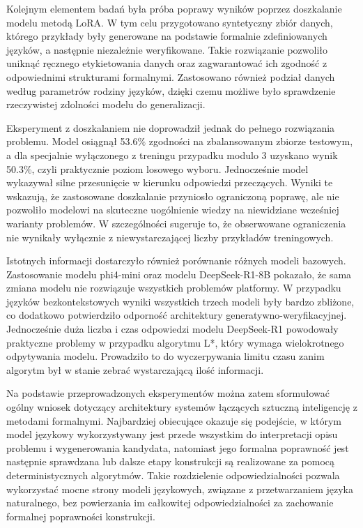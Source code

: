 \documentclass[12pt]{article}
\begin{document}
Kolejnym elementem badań była próba poprawy wyników poprzez doszkalanie modelu metodą LoRA. W tym celu przygotowano syntetyczny zbiór danych, którego przykłady były generowane na podstawie formalnie zdefiniowanych języków, a następnie niezależnie weryfikowane. Takie rozwiązanie pozwoliło uniknąć ręcznego etykietowania danych oraz zagwarantować ich zgodność z odpowiednimi strukturami formalnymi. Zastosowano również podział danych według parametrów rodziny języków, dzięki czemu możliwe było sprawdzenie rzeczywistej zdolności modelu do generalizacji.

Eksperyment z doszkalaniem nie doprowadził jednak do pełnego rozwiązania problemu. Model osiągnął 53.6\(\%\) zgodności na zbalansowanym zbiorze testowym, a dla specjalnie wyłączonego z treningu przypadku modulo 3 uzyskano wynik 50.3\%, czyli praktycznie poziom losowego wyboru. Jednocześnie model wykazywał silne przesunięcie w kierunku odpowiedzi przeczących. Wyniki te wskazują, że zastosowane doszkalanie przyniosło ograniczoną poprawę, ale nie pozwoliło modelowi na skuteczne uogólnienie wiedzy na niewidziane wcześniej warianty problemów. W szczególności sugeruje to, że obserwowane ograniczenia nie wynikały wyłącznie z niewystarczającej liczby przykładów treningowych.

Istotnych informacji dostarczyło również porównanie różnych modeli bazowych. Zastosowanie modelu phi4-mini oraz modelu DeepSeek-R1-8B pokazało, że sama zmiana modelu nie rozwiązuje wszystkich problemów platformy. W przypadku języków bezkontekstowych wyniki wszystkich trzech modeli były bardzo zbliżone, co dodatkowo potwierdziło odporność architektury generatywno-weryfikacyjnej. Jednocześnie duża liczba i czas odpowiedzi modelu DeepSeek-R1 powodowały praktyczne problemy w przypadku algorytmu L*, który wymaga wielokrotnego odpytywania modelu. Prowadziło to do wyczerpywania limitu czasu zanim algorytm był w stanie zebrać wystarczającą ilość informacji.

Na podstawie przeprowadzonych eksperymentów można zatem sformułować ogólny wniosek dotyczący architektury systemów łączących sztuczną inteligencję z metodami formalnymi. Najbardziej obiecujące okazuje się podejście, w którym model językowy wykorzystywany jest przede wszystkim do interpretacji opisu problemu i wygenerowania kandydata, natomiast jego formalna poprawność jest następnie sprawdzana lub dalsze etapy konstrukcji są realizowane za pomocą deterministycznych algorytmów. Takie rozdzielenie odpowiedzialności pozwala wykorzystać mocne strony modeli językowych, związane z przetwarzaniem języka naturalnego, bez powierzania im całkowitej odpowiedzialności za zachowanie formalnej poprawności konstrukcji.
\end{document}

